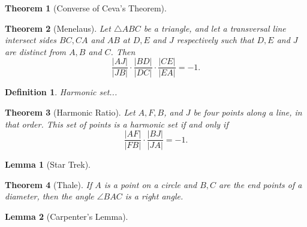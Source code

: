 \documentclass[12pt]{amsart}
\newtheorem*{theorem}{Theorem}
\newtheorem*{lemma}{Lemma}
\newtheorem*{definition}{Definition}
\theoremstyle{remark}
\newtheorem*{basic notion}{Basic Notion}
\begin{document}
\begin{theorem}[Converse of Ceva's Theorem]
\end{theorem}
\begin{theorem}[Menelaus] Let $\triangle ABC$ be a triangle, and let a transversal line intersect sides $BC, CA$ and $AB$ at $D, E$ and $J$ respectively such that $D, E$ and $J$ are distinct from $A, B$ and $C$. Then $$\frac{|AJ|}{|JB|}\cdot\frac{|BD|}{|DC|}\cdot\frac{|CE|}{|EA|}=-1.$$
\end{theorem}
\begin{definition} Harmonic set...\end{definition}
\begin{theorem}[Harmonic Ratio] Let $A, F, B$, and $J$ be four points along a line, in that order. This set of points is a harmonic set if and only if $$\frac{|AF|}{|FB|}\cdot\frac{|BJ|}{|JA|}=-1.$$\end{theorem}
\begin{lemma}[Star Trek]
\end{lemma}
\begin{theorem}[Thale] If $A$ is a point on a circle and $B,C$ are the end points of a diameter, then the angle $\angle BAC$ is  a right angle.\end{theorem}
\begin{lemma}[Carpenter's Lemma]
\end{lemma}
 
\end{document}
